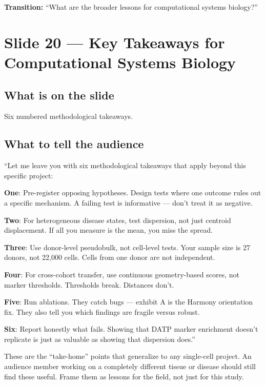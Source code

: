 \documentclass[11pt]{article}
\begin{document}
\textbf{Transition:} ``What are the broader lessons for computational systems biology?''


\section{Slide 20 --- Key Takeaways for Computational Systems Biology}

\subsection{What is on the slide}

Six numbered methodological takeaways.

\subsection{What to tell the audience}

\begin{speaknote}
``Let me leave you with six methodological takeaways that apply beyond this specific project:

\textbf{One}: Pre-register opposing hypotheses. Design tests where one outcome rules out a specific mechanism. A failing test is informative --- don't treat it as negative.

\textbf{Two}: For heterogeneous disease states, test dispersion, not just centroid displacement. If all you measure is the mean, you miss the spread.

\textbf{Three}: Use donor-level pseudobulk, not cell-level tests. Your sample size is 27 donors, not 22,000 cells. Cells from one donor are not independent.

\textbf{Four}: For cross-cohort transfer, use continuous geometry-based scores, not marker thresholds. Thresholds break. Distances don't.

\textbf{Five}: Run ablations. They catch bugs --- exhibit A is the Harmony orientation fix. They also tell you which findings are fragile versus robust.

\textbf{Six}: Report honestly what fails. Showing that DATP marker enrichment doesn't replicate is just as valuable as showing that dispersion does.''
\end{speaknote}

\begin{whyblock}
These are the ``take-home'' points that generalize to any single-cell project. An audience member working on a completely different tissue or disease should still find these useful. Frame them as lessons for the field, not just for this study.
\end{whyblock}
\end{document}
